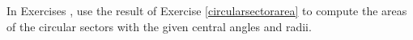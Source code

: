 {\noindent In Exercises}
{, use the result of Exercise \ref{circularsectorarea} to compute the areas of the circular sectors with the given central angles and radii.}
